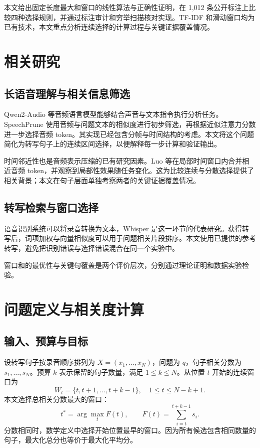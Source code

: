\documentclass[10pt,journal,compsoc]{IEEEtran}
\begin{document}
本文给出固定长度最大和窗口的线性算法与正确性证明，在 1,012 条公开标注上比较四种选择规则，并通过标注审计和穷举扫描核对实现。TF-IDF 和滑动窗口均为已有技术，本文重点分析连续选择的计算过程与关键证据覆盖情况。

\section{相关研究}
\subsection{长语音理解与相关信息筛选}
Qwen2-Audio 等音频语言模型能够结合声音与文本指令执行分析任务\cite{chu2024qwen}。SpeechPrune 使用音频与问题文本的相似度进行初步筛选，再根据近似注意力分数进一步选择音频 token\cite{lin2025speechprune}。其实现已经包含分帧与时间结构的考虑。本文将这个问题简化为转写句子上的连续区间选择，以便解释每一步计算和验证输出。

时间邻近性也是音频表示压缩的已有研究因素。Luo 等在局部时间窗口内合并相近音频 token，并观察到局部性效果随任务变化\cite{luo2026locality}。这为比较连续与分散选择提供了相关背景；本文在句子层面单独考察两者的关键证据覆盖情况。

\subsection{转写检索与窗口选择}
语音识别系统可以将录音转换为文本，Whisper 是这一环节的代表研究\cite{radford2023whisper}。获得转写后，词项加权与向量相似度可以用于问题相关片段排序\cite{manning2008ir}。本文使用已提供的参考转写，避免把识别错误与选择错误混合在同一个实验中。

窗口和的最优性与关键句覆盖是两个评价层次，分别通过理论证明和数据实验检验。

\section{问题定义与相关度计算}
\subsection{输入、预算与目标}
设转写句子按录音顺序排列为 $X=(x_1,\ldots,x_N)$，问题为 $q$，句子相关分数为 $s_1,\ldots,s_N$。预算 $k$ 表示保留的句子数量，满足 $1\le k\le N$。从位置 $t$ 开始的连续窗口为
\begin{equation}
 W_t=\{t,t+1,\ldots,t+k-1\},\quad 1\le t\le N-k+1.
\end{equation}
本文选择总相关分数最大的窗口：
\begin{equation}
 t^*=\arg\max_t F(t),\qquad F(t)=\sum_{i=t}^{t+k-1}s_i.
 \label{eq:target}
\end{equation}
分数相同时，数学定义中选择开始位置最早的窗口。因为所有候选包含相同数量的句子，最大化总分也等价于最大化平均分。
\end{document}
